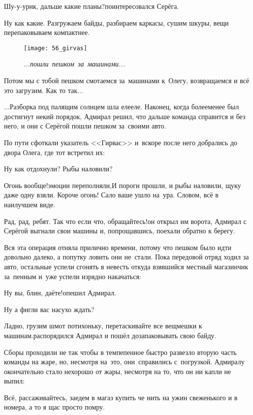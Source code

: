 \diagdash Шу-у-урик, дальше какие планы?\mdash поинтересовался Серёга.

\diagdash Ну как какие. Разгружаем байды, разбираем каркасы, сушим шкуры, вещи перепаковываем компактнее. \begin{wrapfigure}[18]{l}{0.5\textwidth}
	\centering
	\texttt{[image: 56\_girvas]}
	\caption{\small\textit{...пошли~пешком~за~машинами...}}
\end{wrapfigure} Потом мы с тобой пешком смотаемся за~машинами к~Олегу, возвращаемся и всё это загрузим. Как то так$\ldots$

$\ldots$Разборка под палящим солнцем шла еле\sdash еле. Наконец, когда более\sdash менее был достигнут некий порядок, Адмирал решил, что дальше команда справится и без него, и они с Серёгой пошли пешком за~своими авто.

По пути сфоткали указатель <<Гирвас>> и~вскоре после него добрались до двора Олега, где тот встретил их:

\diagdash Ну как отдохнули? Рыбы наловили?

\diagdash Огонь вообще!\mdash эмоции переполняли,\mdash И пороги прошли, и рыбы наловили, щуку даже одну взяли. Короче огонь! Сало ваше ушло на~ура. Словом, всё в наилучшем виде.

\diagdash Рад, рад, ребят. Так что если что, обращайтесь!\mdash он открыл им ворота, Адмирал с Серёгой выгнали свои машины и, попрощавшись, поехали обратно к берегу.

Вся эта операция отняла прилично времени, потому что пешком было идти довольно далеко, а попутку ловить они не~стали. Пока передовой отряд ходил за авто, остальные успели сгонять в невесть откуда взявшийся местный магазинчик за~пенным и~уже успели изрядно накачаться:

\diagdash Ну вы, блин, даёте!\mdash опешил Адмирал.

\diagdash Ну а фигли вас насухо ждать?

\diagdash Ладно, грузим шмот потихоньку, перетаскивайте все вещмешки к машинам.\mdash распорядился Адмирал и пошёл дозапаковывать свою байду.

Сборы проходили не так чтобы в темпе\mdash пенное быстро развезло вторую часть команды на жаре, но, несмотря на~это, они~справились с~погрузкой. Адмиралу окончательно стало нехорошо от жары, несмотря на то, что он ни капли не выпил:

\diagdash Всё, рассаживайтесь, заедем в магаз купить че нить на ужин свеженького и в номера, а то я щас просто помру.

